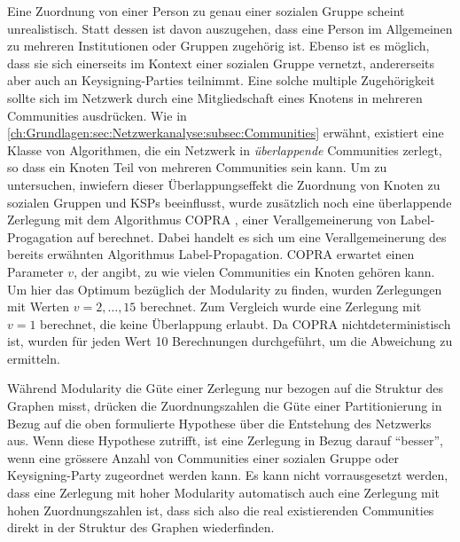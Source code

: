 Eine Zuordnung von einer Person zu genau einer sozialen Gruppe scheint
unrealistisch. Statt dessen ist davon auszugehen, dass eine Person im
Allgemeinen zu mehreren Institutionen oder Gruppen zugeh\"orig
ist. Ebenso ist es m\"oglich, dass sie sich einerseits im Kontext
einer sozialen Gruppe vernetzt, andererseits aber auch an
Keysigning-Parties teilnimmt. Eine solche multiple Zugeh\"origkeit
sollte sich im Netzwerk durch eine Mitgliedschaft eines Knotens in
mehreren Communities ausdr\"ucken. Wie in
\ref{ch:Grundlagen:sec:Netzwerkanalyse:subsec:Communities} erw\"ahnt,
existiert eine Klasse von Algorithmen, die ein Netzwerk in
\emph{\"uberlappende} Communities zerlegt, so dass ein Knoten Teil von
mehreren Communities sein kann. Um zu untersuchen, inwiefern dieser
\"Uberlappungseffekt die Zuordnung von Knoten zu sozialen Gruppen und
KSPs beeinflusst, wurde zus\"atzlich noch eine \"uberlappende
Zerlegung mit dem Algorithmus COPRA \cite{Gregory2010}, einer
Verallgemeinerung von Label-Progagation auf berechnet. Dabei handelt
es sich um eine Verallgemeinerung des bereits erw\"ahnten Algorithmus
Label-Propagation. COPRA erwartet einen Parameter $v$, der angibt, zu
wie vielen Communities ein Knoten geh\"oren kann. Um hier das Optimum
bez\"uglich der Modularity zu finden, wurden Zerlegungen mit Werten
$v=2, \dots, 15$ berechnet. Zum Vergleich wurde eine Zerlegung mit
$v=1$ berechnet, die keine \"Uberlappung erlaubt. Da COPRA
nichtdeterministisch ist, wurden f\"ur jeden Wert 10 Berechnungen
durchgef\"uhrt, um die Abweichung zu ermitteln.

W\"ahrend Modularity die G\"ute einer Zerlegung nur bezogen auf die
Struktur des Graphen misst, dr\"ucken die Zuordnungszahlen die G\"ute
einer Partitionierung in Bezug auf die oben formulierte Hypothese
\"uber die Entstehung des Netzwerks aus. Wenn diese Hypothese
zutrifft, ist eine Zerlegung in Bezug darauf ``besser'', wenn eine
gr\"ossere Anzahl von Communities einer sozialen Gruppe oder
Keysigning-Party zugeordnet werden kann. Es kann nicht vorrausgesetzt
werden, dass eine Zerlegung mit hoher Modularity automatisch auch eine
Zerlegung mit hohen Zuordnungszahlen ist, dass sich also die real
existierenden Communities direkt in der Struktur des Graphen
wiederfinden.

